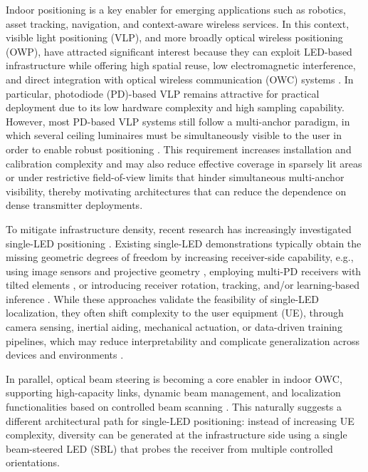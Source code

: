 \documentclass[conference]{IEEEtran}
\begin{document}
Indoor positioning is a key enabler for emerging applications such as robotics, asset tracking, navigation, and context-aware wireless services. In this context, visible light positioning (VLP), and more broadly optical wireless positioning (OWP), have attracted significant interest because they can exploit LED-based infrastructure while offering high spatial reuse, low electromagnetic interference, and direct integration with optical wireless communication (OWC) systems \cite{Zhuang2018,Wang2024}. In particular, photodiode (PD)-based VLP remains attractive for practical deployment due to its low hardware complexity and high sampling capability. However, most PD-based VLP systems still follow a multi-anchor paradigm, in which several ceiling luminaires must be simultaneously visible to the user in order to enable robust positioning \cite{Bakar2021}. 
This requirement increases installation and calibration complexity and may also 
reduce effective coverage in sparsely lit areas or under restrictive field-of-view limits that hinder simultaneous multi-anchor visibility, 
thereby motivating architectures that can reduce the dependence on dense transmitter deployments.



To mitigate infrastructure density, recent research has increasingly investigated single-LED positioning \cite{Zhang2017,Hou2016,Li2023,Yu2018,Kim2022,Tran2022}. Existing single-LED demonstrations typically obtain the missing geometric degrees of freedom by increasing receiver-side capability, e.g., using image sensors and projective geometry \cite{Zhang2017,Hou2016,Li2023}, employing multi-PD receivers with tilted elements \cite{Yu2018}, or introducing receiver rotation, tracking, and/or learning-based inference \cite{Kim2022,Tran2022}. 
While these approaches validate the feasibility of single-LED localization, they often shift complexity to the user equipment (UE), through camera sensing, inertial aiding, mechanical actuation, or data-driven training pipelines, which may reduce interpretability and complicate generalization across devices and environments \cite{Tran2022}. 

In parallel, optical beam steering is becoming a core enabler in indoor OWC, supporting high-capacity links, dynamic beam management, and localization functionalities based on controlled beam scanning \cite{Koonen2021}. 
This naturally suggests a different architectural path for single-LED positioning: instead of increasing UE complexity, diversity can be generated at the infrastructure side using a single beam-steered LED (SBL) that probes the receiver from multiple controlled orientations.
\end{document}
